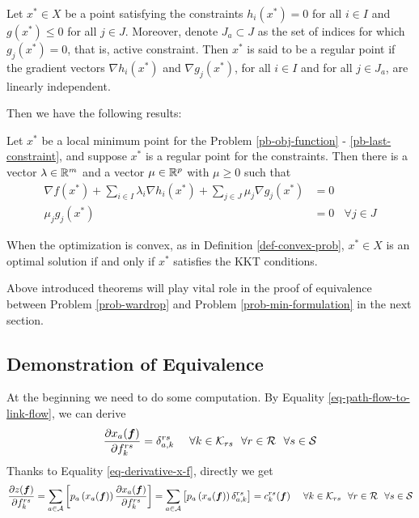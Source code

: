 \documentclass{article}
\begin{document}
\begin{defi}  
    Let $ x^* \in X $ be a point satisfying the constraints $ h_i (x^*) = 0 $ for all $ i \in I $ and $ g(x^*) \le 0 $ for all $ j \in J $. Moreover, denote $ J_a \subset J $ as the set of indices for which $ g_j (x^*) = 0 $, that is, active constraint. Then $ x^* $ is said to be a regular point if the gradient vectors $ \nabla h_i (x^*) $ and $ \nabla g_j (x^*) $, for all $ i \in I $ and for all $ j \in J_a $, are linearly independent.
\end{defi}

Then we have the following results:

\begin{theo} Let $ x^* $ be a local minimum point for the Problem \ref{pb-obj-function} - \ref{pb-last-constraint}, and suppose $ x^* $ is a regular point for the constraints. Then there is a vector $ \lambda \in \mathbb{R}^m $ and a vector $ \mu \in \mathbb{R} ^p $ with $ \mu \ge 0 $ such that
\begin{align*}
    \nabla f (x^*) + \sum_{i \in I} \lambda_i \nabla h_i (x^*) + \sum_{j \in J} \mu_j \nabla g_j (x^*) &= 0 \\ 
    \mu_j g_j(x^*) &= 0 ~~~~ \forall j \in J
\end{align*}
\end{theo}

\begin{theo}  \label{theo-kkt-for-convex}
    When the optimization is convex, as in Definition \ref{def-convex-prob}, $ x^* \in X $ is an optimal solution if and only if $ x^* $ satisfies the KKT conditions.
\end{theo}

Above introduced theorems will play vital role in the proof of equivalence between Problem \ref{prob-wardrop} and Problem \ref{prob-min-formulation} in the next section.

\subsection{Demonstration of Equivalence}

At the beginning we need to do some computation. By Equality \ref{eq-path-flow-to-link-flow}, we can derive
\begin{equation} \label{eq-derivative-x-f}
    \frac{\partial x_a (\boldsymbol{f})}{\partial f^{rs}_k} = \delta^{rs}_{a, k} ~~~~ \forall k \in \mathcal{K}_{rs} ~~ \forall r \in \mathcal{R} ~~ \forall s \in \mathcal{S}
\end{equation}
Thanks to Equality \ref{eq-derivative-x-f}, directly we get
\begin{equation} \label{eq-derivative-z-f}
    \frac{\partial z (\boldsymbol{f})}{\partial f_k^{rs}} = \sum_{a \in \mathcal{A}} \left[ p_a \left(x_a (\boldsymbol{f})\right) \frac{\partial x_a (\boldsymbol{f})}{\partial f_k^{rs}} \right] = \sum_{a \in \mathcal{A}} \left[ p_a \left(x_a (\boldsymbol{f})\right) \delta_{a, k}^{rs} \right] = c_k^{rs} (\boldsymbol{f}) ~~~~ \forall k \in \mathcal{K}_{rs} ~~ \forall r \in \mathcal{R} ~~ \forall s \in \mathcal{S}
\end{equation}
\end{document}
